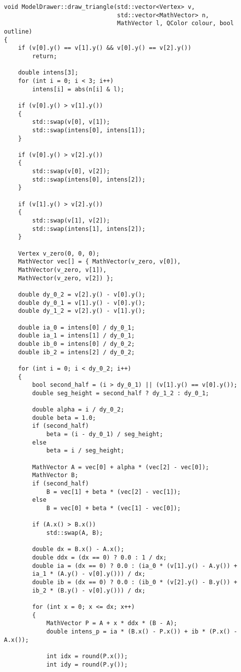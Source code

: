 \begin{lstlisting}[caption=Функция отрисовки грани, label=list:draw_triangle]
void ModelDrawer::draw_triangle(std::vector<Vertex> v,
								std::vector<MathVector> n,
								MathVector l, QColor colour, bool outline)
{
	if (v[0].y() == v[1].y() && v[0].y() == v[2].y())
		return;
	
	double intens[3];
	for (int i = 0; i < 3; i++)
		intens[i] = abs(n[i] & l);
	
	if (v[0].y() > v[1].y())
	{
		std::swap(v[0], v[1]);
		std::swap(intens[0], intens[1]);
	}
	
	if (v[0].y() > v[2].y())
	{
		std::swap(v[0], v[2]);
		std::swap(intens[0], intens[2]);
	}
	
	if (v[1].y() > v[2].y())
	{
		std::swap(v[1], v[2]);
		std::swap(intens[1], intens[2]);
	}
	
	Vertex v_zero(0, 0, 0);
	MathVector vec[] = { MathVector(v_zero, v[0]),
	MathVector(v_zero, v[1]),
	MathVector(v_zero, v[2]) };
	
	double dy_0_2 = v[2].y() - v[0].y();
	double dy_0_1 = v[1].y() - v[0].y();
	double dy_1_2 = v[2].y() - v[1].y();
	
	double ia_0 = intens[0] / dy_0_1;
	double ia_1 = intens[1] / dy_0_1;
	double ib_0 = intens[0] / dy_0_2;
	double ib_2 = intens[2] / dy_0_2;
	
	for (int i = 0; i < dy_0_2; i++)
	{
		bool second_half = (i > dy_0_1) || (v[1].y() == v[0].y());
		double seg_height = second_half ? dy_1_2 : dy_0_1;
		
		double alpha = i / dy_0_2;
		double beta = 1.0;
		if (second_half)
			beta = (i - dy_0_1) / seg_height;
		else
			beta = i / seg_height;
		
		MathVector A = vec[0] + alpha * (vec[2] - vec[0]);
		MathVector B;
		if (second_half)
			B = vec[1] + beta * (vec[2] - vec[1]);
		else
			B = vec[0] + beta * (vec[1] - vec[0]);
		
		if (A.x() > B.x())
			std::swap(A, B);
		
		double dx = B.x() - A.x();
		double ddx = (dx == 0) ? 0.0 : 1 / dx;
		double ia = (dx == 0) ? 0.0 : (ia_0 * (v[1].y() - A.y()) +
		ia_1 * (A.y() - v[0].y())) / dx;
		double ib = (dx == 0) ? 0.0 : (ib_0 * (v[2].y() - B.y()) +
		ib_2 * (B.y() - v[0].y())) / dx;
		
		for (int x = 0; x <= dx; x++)
		{
			MathVector P = A + x * ddx * (B - A);
			double intens_p = ia * (B.x() - P.x()) + ib * (P.x() - A.x());
			
			int idx = round(P.x());
			int idy = round(P.y());
			

\end{lstlisting}
